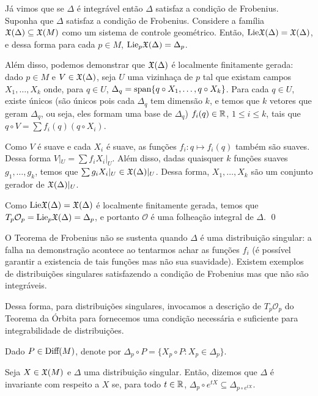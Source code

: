 \dem Já vimos que se $\Delta$ é integrável então $\Delta$
satisfaz a condição de Frobenius.
Suponha que $\Delta$ satisfaz a condição de Frobenius.
Considere a família $\mathfrak{X}(\Delta) \subseteq \mathfrak{X}(M)$ como um sistema de controle
geométrico.
Então, $\text{Lie} \mathfrak{X}(\Delta) = \mathfrak{X}(\Delta)$, e dessa forma
para cada $p \in M$, $\text{Lie}_p \mathfrak{X}(\Delta) = \Delta_p$.

Além disso, podemos demonstrar que $\mathfrak{X}(\Delta)$ é localmente
finitamente gerada: dado $p \in M$ e $V \in \mathfrak{X}(\Delta)$, seja $U$ uma vizinhaça
de $p$ tal que existam campos $X_1, \dots, X_k$ onde, para $q \in U$,
$\Delta_q = \text{span}\{q\circ X_1, \dots, q\circ X_k\}$. Para cada $q\in U$,
existe únicos (são únicos
pois cada $\Delta_q$ tem dimensão $k$,
e temos que $k$ vetores que geram $\Delta_q$, ou seja,
eles formam uma base de $\Delta_q$) $f_i(q) \in \mathbb{R}$, $1 \leq i \leq k$, tais que
$q\circ V = \sum f_i(q) (q \circ X_i)$.

Como $V$ é suave e cada $X_i$ é suave, as funções $f_i:q \mapsto f_i(q)$ também são suaves.
Dessa forma $V|_U = \sum f_i X_i|_U$. Além disso, dadas quaisquer $k$ funções suaves
$g_1, \dots, g_k$, temos que $\sum g_i X_i|_U \in \mathfrak{X}(\Delta)|_U$. Dessa forma,
$X_1, \dots, X_k$ são um conjunto gerador de $\mathfrak{X}(\Delta)|_U$.

Como $\text{Lie} \mathfrak{X}(\Delta) = \mathfrak{X}(\Delta)$ é localmente finitamente gerada, temos que
$T_p \mathcal{O}_p = \text{Lie}_p \mathfrak{X}(\Delta) = \Delta_p$, e portanto
$\mathcal{O}$ é uma folheação integral de $\Delta$. \qed

O Teorema de Frobenius não se sustenta quando $\Delta$ é uma distribuição singular:
a falha na demonstração acontece ao tentarmos achar as funções $f_i$ (é possível garantir
a existencia de tais funções mas não sua suavidade). Existem exemplos
de distribuições singulares satisfazendo a condição de Frobenius mas que não
são integráveis.

Dessa forma, para distribuições singulares, invocamos a descrição de
$T_p \mathcal{O}_p$ do Teorema da Órbita para fornecemos uma condição necessária
e suficiente para integrabilidade de distribuições.

Dado $P \in \text{Diff}(M)$, denote por $\Delta_p \circ P = \{X_p \circ P : X_p \in \Delta_p\}$.

\begin{definition}
    Seja $X \in \mathfrak{X}(M)$ e $\Delta$ uma distribuição singular. Então, dizemos
    que $\Delta$ é invariante com respeito a $X$ se,
    para todo $t \in \mathbb{R}$, $\Delta_p \circ e^{tX} \subseteq \Delta_{p \circ e^{tX}}$.
\end{definition}

